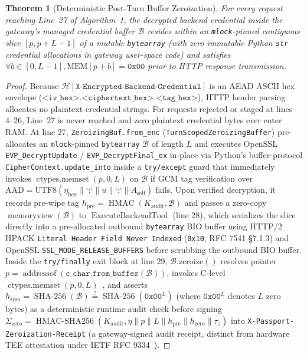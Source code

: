 \documentclass[conference,10pt]{IEEEtran}
\newtheorem{theorem}{Theorem}
\begin{document}
\begin{theorem}[Deterministic Post-Turn Buffer Zeroization]
\label{thm:ram}
For every request reaching Line~27 of Algorithm~1, the decrypted backend credential inside the gateway's managed credential buffer $\mathcal{B}$ resides within an \texttt{mlock}-pinned contiguous slice $[p, p + L - 1]$ of a mutable \texttt{bytearray} (with zero immutable Python \texttt{str} credential allocations in gateway user-space code) and satisfies $\forall b \in [0, L-1], \text{MEM}[p + b] = \texttt{0x00}$ prior to HTTP response transmission.
\end{theorem}
\begin{proof}
Because $\mathcal{H}[\texttt{X-Encrypted-Backend-Credential}]$ is an AEAD ASCII hex envelope ($\texttt{<iv\_hex>.<ciphertext\_hex>.<tag\_hex>}$), HTTP header parsing allocates no plaintext credential strings. For requests rejected or staged at lines 4--26, Line~27 is never reached and zero plaintext credential bytes ever enter RAM. At line 27, \texttt{ZeroizingBuf.from\_enc} (\texttt{TurnScopedZeroizingBuffer}) pre-allocates an \texttt{mlock}-pinned \texttt{bytearray} $\mathcal{B}$ of length $L$ and executes OpenSSL \texttt{EVP\_DecryptUpdate} / \texttt{EVP\_DecryptFinal\_ex} in-place via Python's buffer-protocol \texttt{CipherContext.update\_into} inside a \texttt{try/except} guard that immediately invokes $\operatorname{ctypes.memset}(p, 0, L)$ on $\mathcal{B}$ if GCM tag verification over $\text{AAD} = \text{UTF8}(\eta_{\text{hex}} \parallel \text{`:`} \parallel u \parallel \text{`:`} \parallel A_{\text{self}})$ fails. Upon verified decryption, it records pre-wipe tag $h_{\text{pre}} = \operatorname{HMAC}(K_{\text{audit}}, \mathcal{B})$ and passes a zero-copy $\operatorname{memoryview}(\mathcal{B})$ to $\operatorname{ExecuteBackendTool}$ (line 28), which serializes the slice directly into a pre-allocated outbound \texttt{bytearray} BIO buffer using HTTP/2 HPACK \texttt{Literal Header Field Never Indexed} (\texttt{0x10}, RFC 7541 \S 7.1.3) and OpenSSL \texttt{SSL\_MODE\_RELEASE\_BUFFERS} before scrubbing the outbound BIO buffer. Inside the \texttt{try/finally} exit block at line 29, $\mathcal{B}.\text{zeroize}()$ resolves pointer $p = \operatorname{addressof}(\texttt{c\_char.from\_buffer}(\mathcal{B}))$, invokes C-level $\operatorname{ctypes.memset}(p, 0, L)$~\cite{chow2005shredding, yang2017dse}, and asserts $h_{\text{zero}} = \operatorname{SHA-256}(\mathcal{B}) \stackrel{?}{=} \operatorname{SHA-256}(\texttt{0x00}^L)$ (where $\texttt{0x00}^L$ denotes $L$ zero bytes) as a deterministic runtime audit check before signing $\Sigma_{\text{zero}} = \operatorname{HMAC-SHA256}(K_{\text{audit}}, \eta \parallel p \parallel L \parallel h_{\text{pre}} \parallel h_{\text{zero}} \parallel \tau_z)$ into \texttt{X-Passport-Zeroization-Receipt} (a gateway-signed audit receipt, distinct from hardware TEE attestation under IETF RFC 9334~\cite{birkholz2023rats}).
\end{proof}
\end{document}
